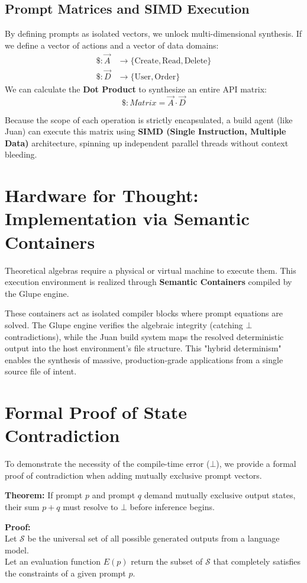 \documentclass[11pt, a4paper]{article}
\begin{document}
\subsection{Prompt Matrices and SIMD Execution}
By defining prompts as isolated vectors, we unlock multi-dimensional synthesis. If we define a vector of actions and a vector of data domains:
\begin{align*}
    \$: \vec{A} &\rightarrow \{ \text{Create}, \text{Read}, \text{Delete} \} \\
    \$: \vec{D} &\rightarrow \{ \text{User}, \text{Order} \}
\end{align*}
We can calculate the \textbf{Dot Product} to synthesize an entire API matrix:
$$ \$: Matrix = \vec{A} \cdot \vec{D} $$

Because the scope of each operation is strictly encapsulated, a build agent (like Juan) can execute this matrix using \textbf{SIMD (Single Instruction, Multiple Data)} architecture, spinning up independent parallel threads without context bleeding.

\section{Hardware for Thought: Implementation via Semantic Containers}
Theoretical algebras require a physical or virtual machine to execute them. This execution environment is realized through \textbf{Semantic Containers} compiled by the Glupe engine. 

These containers act as isolated compiler blocks where prompt equations are solved. The Glupe engine verifies the algebraic integrity (catching $\bot$ contradictions), while the Juan build system maps the resolved deterministic output into the host environment's file structure. This "hybrid determinism" enables the synthesis of massive, production-grade applications from a single source file of intent.

\section{Formal Proof of State Contradiction}
To demonstrate the necessity of the compile-time error ($\bot$), we provide a formal proof of contradiction when adding mutually exclusive prompt vectors. 

\textbf{Theorem:} If prompt $p$ and prompt $q$ demand mutually exclusive output states, their sum $p + q$ must resolve to $\bot$ before inference begins.

\textbf{Proof:} \\
Let $\mathcal{S}$ be the universal set of all possible generated outputs from a language model. \\
Let an evaluation function $E(p)$ return the subset of $\mathcal{S}$ that completely satisfies the constraints of a given prompt $p$. 
\end{document}
